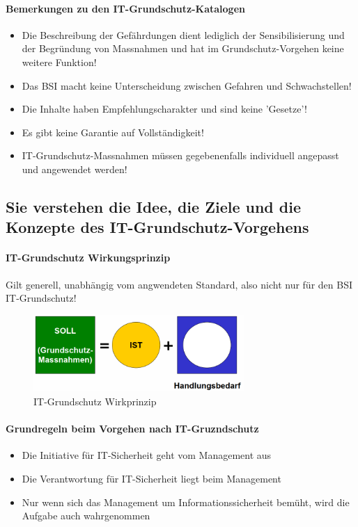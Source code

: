 \documentclass[10pt,a4paper]{article}
\begin{document}
\paragraph*{Bemerkungen zu den IT-Grundschutz-Katalogen}
\begin{itemize}[noitemsep,topsep=0pt,leftmargin=*]
    \item Die Beschreibung der Gefährdungen dient lediglich
    der Sensibilisierung und der Begründung von
    Massnahmen und hat im Grundschutz-Vorgehen keine
    weitere Funktion!
    \item Das BSI macht keine Unterscheidung zwischen
    Gefahren und Schwachstellen!
    \item Die Inhalte haben Empfehlungscharakter und sind
    keine 'Gesetze'!
    \item Es gibt keine Garantie auf Vollständigkeit!
    \item IT-Grundschutz-Massnahmen müssen gegebenenfalls
    individuell angepasst und angewendet werden!
\end{itemize}

\subsection*{Sie verstehen die Idee, die Ziele und die Konzepte des IT-Grundschutz-Vorgehens}

\paragraph*{IT-Grundschutz Wirkungsprinzip} Gilt generell, unabhängig vom angwendeten Standard, also nicht nur für den BSI IT-Grundschutz!
\begin{figure}[H]
    \begin{center}
    \includegraphics[width=8cm]{images/Grundschutz_Wirkprinzip.png}
    \caption{IT-Grundschutz Wirkprinzip}
    \label{IT-Grundschutz Wirkprinzip}
    \end{center}
\end{figure}

\paragraph*{Grundregeln beim Vorgehen nach IT-Gruzndschutz}
\begin{itemize}[noitemsep,topsep=0pt,leftmargin=*]
    \item Die Initiative für IT-Sicherheit geht vom Management
    aus
    \item Die Verantwortung für IT-Sicherheit liegt beim
    Management
    \item Nur wenn sich das Management um
    Informationssicherheit bemüht, wird die Aufgabe auch
    wahrgenommen
\end{itemize}
\end{document}
